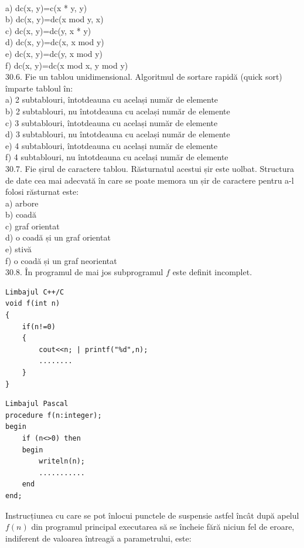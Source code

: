 \begin{itemize}
\\
a) dc(x, y)=c(x * y, y)
\\
b) dc(x, y)=dc(x mod y, x)
\\
c) dc(x, y)=dc(y, x * y)
\\
d) dc(x, y)=dc(x, x mod y)
\\
e) dc(x, y)=dc(y, x mod y)
\\
f) dc(x, y)=dc(x mod x, y mod y)
\\
30.6. Fie un tablou unidimensional. Algoritmul de sortare rapidă (quick sort) împarte tabloul în:
\\
a) 2 subtablouri, întotdeauna cu același număr de elemente
\\
b) 2 subtablouri, nu întotdeauna cu același număr de elemente
\\
c) 3 subtablouri, întotdeauna cu același număr de elemente
\\
d) 3 subtablouri, nu întotdeauna cu același număr de elemente
\\
e) 4 subtablouri, întotdeauna cu același număr de elemente
\\
f) 4 subtablouri, nu întotdeauna cu același număr de elemente
\\
30.7. Fie șirul de caractere tablou. Răsturnatul acestui șir este uolbat. Structura de date cea mai adecvată în care se poate memora un șir de caractere pentru a-l folosi răsturnat este:
\\
a) arbore
\\
b) coadă
\\
c) graf orientat
\\
d) o coadă și un graf orientat
\\
e) stivă
\\
f) o coadă și un graf neorientat
\\
30.8. În programul de mai jos subprogramul $f$ este definit incomplet.
\begin{verbatim}
Limbajul C++/C
void f(int n)
{
    if(n!=0)
    {
        cout<<n; | printf("%d",n);
        ........
    }
}
\end{verbatim}
\begin{verbatim}
Limbajul Pascal
procedure f(n:integer);
begin
    if (n<>0) then
    begin
        writeln(n);
        ...........
    end
end;
\end{verbatim}
Instrucțiunea cu care se pot înlocui punctele de suspensie astfel încât după apelul $f(n)$ din programul principal executarea să se încheie fără niciun fel de eroare, indiferent de valoarea întreagă a parametrului, este:
\\

\end{itemize}
